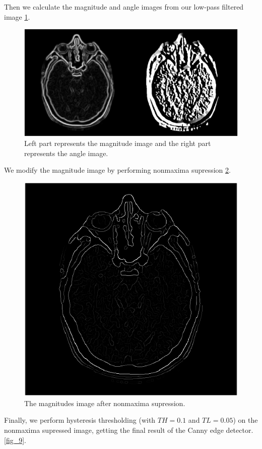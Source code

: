 \documentclass[9pt]{IEEEtran}
\begin{document}
Then we calculate the magnitude and angle images from our low-pass filtered image \ref{fig_7}.

\begin{figure}[!htb]
\centering
\includegraphics[width=0.8\columnwidth]{magnitudes_angles.png}
\caption[c1]{ Left part represents the magnitude image and the right part represents the angle image. }
\label{fig_7}
\end{figure}

We modify the magnitude image by performing nonmaxima supression \ref{fig_8}.

\begin{figure}[!t]
\centering
\includegraphics[width=0.8\columnwidth]{suppressed_image.png}
\caption[c1]{ The magnitudes image after nonmaxima supression. }
\label{fig_8}
\end{figure}


Finally, we perform hysteresis thresholding (with $TH = 0.1$ and $TL = 0.05$) on the nonmaxima supressed image, getting the final result of the Canny edge detector. \ref{fig_9}.
\end{document}
